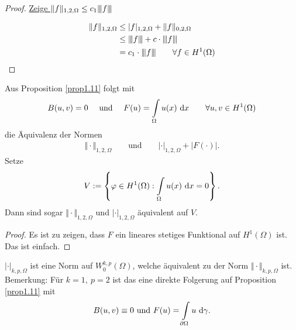 \begin{proof}
	\underline{Zeige $\|f\|_{1,2,\Omega}\leq c_1 {\left\vert\kern-0.25ex\left\vert\kern-0.25ex\left\vert f\right\vert\kern-0.25ex\right\vert\kern-0.25ex\right\vert}$}

	\begin{align*}
		\Vert f\Vert_{1,2,\Omega}
		&\leq
		|f|_{1,2,\Omega}+\Vert f\Vert_{0,2,\Omega}\\
		&\leq
		{\left\vert\kern-0.25ex\left\vert\kern-0.25ex\left\vert f\right\vert\kern-0.25ex\right\vert\kern-0.25ex\right\vert}+c\cdot{\left\vert\kern-0.25ex\left\vert\kern-0.25ex\left\vert f\right\vert\kern-0.25ex\right\vert\kern-0.25ex\right\vert}\\
		&=c_1\cdot{\left\vert\kern-0.25ex\left\vert\kern-0.25ex\left\vert f\right\vert\kern-0.25ex\right\vert\kern-0.25ex\right\vert}\qquad\forall f\in H^1(\Omega)
	\end{align*}
\end{proof}

\begin{korollar}\label{korollarPoincareUngleichung}\enter %
	Aus Proposition \ref{prop1.11} folgt mit
	\begin{align*}
		B(u,v)=0\quad\text{ und }\quad F(u)=\int\limits_\Omega u(x)\text{ d} x
		\qquad\forall u,v\in H^1(\Omega)
	\end{align*}
	die Äquivalenz der Normen
	\begin{align*}
		\Vert\cdot\Vert_{1,2,\Omega}
		\qquad\text{und}\qquad
		|\cdot|_{1,2,\Omega}+|F(\cdot)|.
	\end{align*}
	Setze
	\begin{align*}
		V:=\left\lbrace\varphi\in H^1(\Omega):\int\limits_\Omega u(x)\text{ d} x=0\right\rbrace.
	\end{align*}
	Dann sind sogar $\Vert\cdot\Vert_{1,2,\Omega}$ und $|\cdot|_{1,2,\Omega}$ äquivalent auf $V$.
\end{korollar}

\begin{proof}
	Es ist zu zeigen, dass $F$ ein lineares stetiges Funktional auf $H^1(\Omega)$  ist. Das ist einfach.
\end{proof}

\begin{proposition}\label{prop1.13FriedrichsUngleichung}\enter
	$|\cdot|_{k,p,\Omega}$ ist eine Norm auf $W_0^{k,p}(\Omega)$, welche äquivalent zu der Norm $\Vert\cdot\Vert_{k,p,\Omega}$ ist.\nl
	Bemerkung: Für $k=1,~p=2$ ist das eine direkte Folgerung auf Proposition \ref{prop1.11} mit
	\begin{align*}
		B(u,v)\equiv0\text{ und } F(u)=\int\limits_{\partial\Omega} u\text{ d} \gamma.
	\end{align*}
\end{proposition}